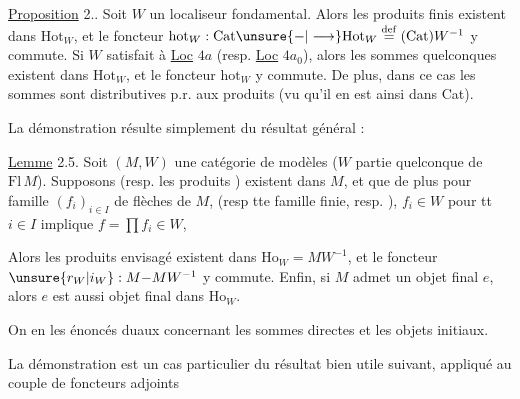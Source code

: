 

\uline{Proposition} 2.. Soit $W$ un localiseur fondamental. Alors les produits finis existent dans $\mathrm{Hot}_W$, et le foncteur $\mathrm{hot}_W:\mathrm{Cat}\unsure{{-}|\longrightarrow}\mathrm{Hot}_W\overset{\mathrm{def}}{=}(\mathrm{Cat})W^{-1}$ y commute. Si $W$ satisfait à \uline{Loc} $4a$ (resp. \uline{Loc} $4a_0$), alors les sommes quelconques  existent dans $\mathrm{Hot}_W$, et le foncteur $\mathrm{hot}_W$ y commute. De plus, dans ce cas les sommes sont distributives p.r. aux produits (vu qu'il en est ainsi dans Cat).

La démonstration résulte simplement du résultat général :

\uline{Lemme} 2.5. Soit $(M,W)$ une catégorie de modèles ($W$ partie quelconque de $\mathrm{Fl}\,M$). Supposons   (resp. les produits )  existent dans $M$, et que de plus pour  famille $(f_i)_{i\in I}$ de flèches de $M$,  (resp tte famille finie, resp. ),  $f_i\in W$ pour tt $i\in I$ implique $f=\prod f_i\in W$,

Alors les produits  envisagé existent dans $\mathrm{Ho}_W=MW^{-1}$, et le foncteur  $\unsure{r_W|i_W}:M{-}MW^{-1}$ y commute. Enfin, si $M$ admet un objet final $e$, alors $e$ est aussi objet final dans $\mathrm{Ho}_W$.



On en  les énoncés duaux concernant les sommes directes et les objets initiaux.

La démonstration est un cas particulier du résultat bien utile suivant, appliqué au couple de foncteurs adjoints


